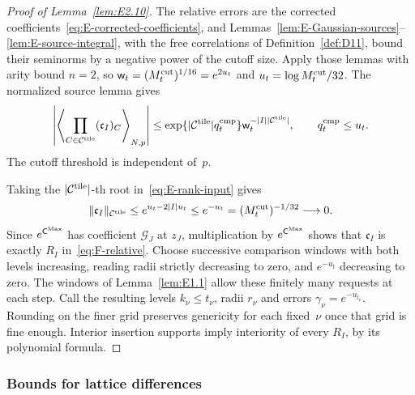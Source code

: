 \begin{proof}[Proof of Lemma~\ref{lem:E2.10}]
The relative errors are the corrected coefficients~\eqref{eq:E-corrected-coefficients}, and Lemmas~\ref{lem:E-Gaussian-sources}--\ref{lem:E-source-integral}, with the free correlations of Definition~\ref{def:D11}, bound their seminorms by a negative power of the cutoff size. Apply those lemmas with arity bound $n=2$, so $\mathsf w_t=(M^{\mathrm{cut}}_t)^{1/16}=e^{2u_t}$ and $u_t=\log M^{\mathrm{cut}}_t/32$. The normalized source lemma gives
\begin{equation}\label{eq:E-rank-input}
 \left|\left\langle\prod_{C\in\mathcal C^{\rm tile}}(\mathfrak c_I)_C\right\rangle_{N,p}\right|
 \le\exp\{|\mathcal C^{\rm tile}|q_t^{\rm cmp}\}
 \mathsf w_t^{-|I||\mathcal C^{\rm tile}|},\qquad q_t^{\rm cmp}\le u_t.
\end{equation}
The cutoff threshold is independent of~$p$.

Taking the $|\mathcal C^{\rm tile}|$-th root in~\eqref{eq:E-rank-input} gives
\begin{equation*}
\|\mathfrak c_I\|_{\mathcal C^{\rm tile}}\le e^{u_t-2|I|u_t}\le e^{-u_t}
=(M^{\mathrm{cut}}_t)^{-1/32}\longrightarrow0.
\end{equation*}
Since $e^{\mathsf C^{\rm Max}}$ has coefficient $\mathcal G_J$ at $z_J$, multiplication by $e^{\mathsf C^{\rm Max}}$ shows that $\mathfrak c_I$ is exactly $R_I$ in~\eqref{eq:F-relative}. Choose successive comparison windows with both levels increasing, reading radii strictly decreasing to zero, and $e^{-u_t}$ decreasing to zero. The windows of Lemma~\ref{lem:E1.1} allow these finitely many requests at each step. Call the resulting levels $k_\nu\le t_\nu$, radii $r_\nu$ and errors $\gamma_\nu=e^{-u_{t_\nu}}$. Rounding on the finer grid preserves genericity for each fixed~$\nu$ once that grid is fine enough. Interior insertion supports imply interiority of every $R_I$, by its polynomial formula.
\end{proof}

\subsubsection{Bounds for lattice differences}\label{sec:partII-E.2.6}

